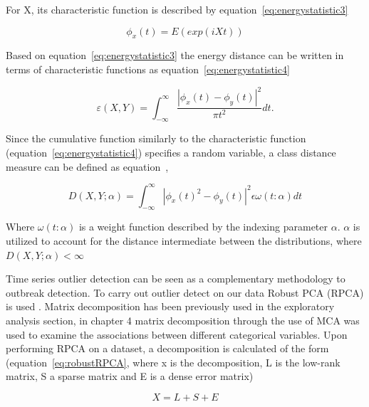 For X, its characteristic function is described by equation~\ref{eq:energystatistic3}

\begin{equation} 
\phi_{x}(t)=E(exp(iXt))
\label{eq:energystatistic3}  \end{equation}

Based on equation~\ref{eq:energystatistic3} the energy distance can be written in terms of characteristic functions as equation~\ref{eq:energystatistic4} 

\begin{equation} 
\varepsilon (X,Y) =\int_{-\infty}^{\infty} \frac{|\phi_{x}(t)-\phi_{y}(t)|^2}{\pi t^2} dt.
\label{eq:energystatistic4}  \end{equation} 

Since the cumulative function similarly to the characteristic function (equation~\ref{eq:energystatistic4}) specifies a random variable, a class distance measure can be defined as equation~\label{eq:energystatistic5},

\begin{equation} 
D(X,Y;\alpha)=\int_{-\infty}^{\infty}|\phi_x(t)^2-\phi_y(t)|^2 \epsilon \omega(t:\alpha) dt
\label{eq:energystatistic5}  \end{equation} 

Where $\omega(t:\alpha)$ is a weight function described by the indexing parameter $\alpha$. $\alpha$ is utilized to account for the distance intermediate between the distributions, where $D(X,Y;\alpha)<\infty$

Time series outlier detection can be seen  as a complementary methodology to outbreak detection. To carry out outlier detect on our data Robust PCA (RPCA) is used \citep{zhou2010stable}. Matrix decomposition has been previously used in the exploratory analysis section, in chapter 4 matrix decomposition through the use of MCA was used to examine the associations between different categorical variables. Upon performing RPCA on a dataset, a decomposition is calculated of the form (equation~\ref{eq:robustRPCA}, where x is the decomposition, L is the low-rank matrix, S a sparse matrix and E is a dense error matrix)

\begin{equation} 
X =L+S+E
\label{eq:robustRPCA}  \end{equation} 


